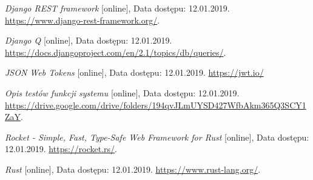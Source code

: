 \documentclass[12pt, notitlepage]{article}
\begin{document}
\newpage

\begin{thebibliography}{9}

\textit{Django REST framework} [online], Data dostępu: 12.01.2019. 
\newline\url{https://www.django-rest-framework.org/}.

\textit{Django Q} [online], Data dostępu: 12.01.2019. 
\newline\url{https://docs.djangoproject.com/en/2.1/topics/db/queries/}.

\textit{JSON Web Tokens} [online], Data dostępu: 12.01.2019. 
\newline\url{https://jwt.io/}

\textit{Opis testów funkcji systemu} [online], Data dostępu: 12.01.2019. 
\newline\url{https://drive.google.com/drive/folders/194qvJLmUYSD427WfbAkm365Q3SCY1ZaY}.

\textit{Rocket - Simple, Fast, Type-Safe Web Framework for Rust} [online], Data dostępu: 12.01.2019. 
\newline\url{https://rocket.rs/}.

\textit{Rust} [online], Data dostępu: 12.01.2019. 
\newline\url{https://www.rust-lang.org/}.

\end{thebibliography} 
\end{document}
